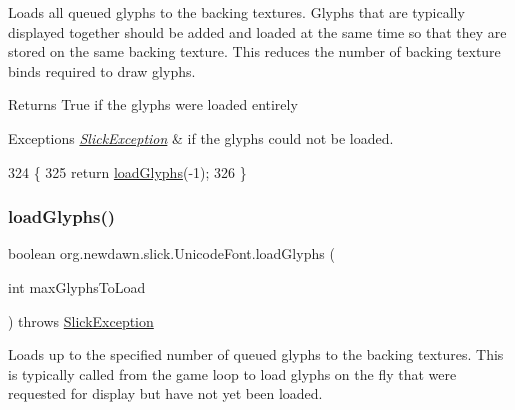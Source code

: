 Loads all queued glyphs to the backing textures. Glyphs that are typically displayed together should be added and loaded at the same time so that they are stored on the same backing texture. This reduces the number of backing texture binds required to draw glyphs.

\begin{DoxyReturn}{Returns}
True if the glyphs were loaded entirely 
\end{DoxyReturn}

\begin{DoxyExceptions}{Exceptions}
{\em \mbox{\hyperlink{classorg_1_1newdawn_1_1slick_1_1_slick_exception}{Slick\+Exception}}} & if the glyphs could not be loaded. \\
\hline
\end{DoxyExceptions}

\begin{DoxyCode}
324                                                        \{
325         \textcolor{keywordflow}{return} \mbox{\hyperlink{classorg_1_1newdawn_1_1slick_1_1_unicode_font_abf14d8ad33f80b66e14990417bd04088}{loadGlyphs}}(-1);
326     \}
\end{DoxyCode}
\mbox{\label{classorg_1_1newdawn_1_1slick_1_1_unicode_font_af8c400ea61a8e7d292d13575840edfe1}} 
\subsubsection{\texorpdfstring{load\+Glyphs()}{loadGlyphs()}\hspace{0.1cm}{\footnotesize\ttfamily [2/2]}}
{\footnotesize\ttfamily boolean org.\+newdawn.\+slick.\+Unicode\+Font.\+load\+Glyphs (\begin{DoxyParamCaption}\item[{int}]{max\+Glyphs\+To\+Load }\end{DoxyParamCaption}) throws \mbox{\hyperlink{classorg_1_1newdawn_1_1slick_1_1_slick_exception}{Slick\+Exception}}\hspace{0.3cm}{\ttfamily [inline]}}

Loads up to the specified number of queued glyphs to the backing textures. This is typically called from the game loop to load glyphs on the fly that were requested for display but have not yet been loaded.


